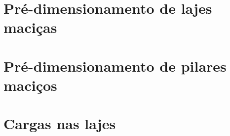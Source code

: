 \documentclass[12pt, a4paper]{article}
\begin{document}
	

	\section{Pré-dimensionamento de lajes maciças}
	

	\section{Pré-dimensionamento de pilares maciços}
	

	\section{Cargas nas lajes}
	
\end{document}
